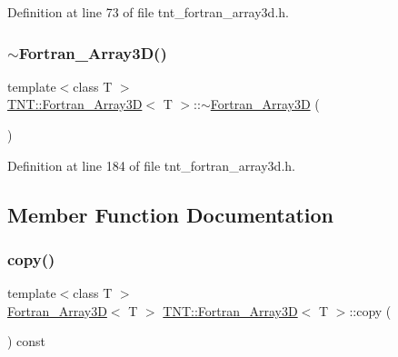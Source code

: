 Definition at line 73 of file tnt\+\_\+fortran\+\_\+array3d.\+h.

\mbox{\label{classTNT_1_1Fortran__Array3D_a9164c5369ef7b82b3c280dc9704527d9}} 
\subsubsection{\texorpdfstring{$\sim$\+Fortran\+\_\+\+Array3\+D()}{~Fortran\_Array3D()}}
{\footnotesize\ttfamily template$<$class T $>$ \\
\hyperlink{classTNT_1_1Fortran__Array3D}{T\+N\+T\+::\+Fortran\+\_\+\+Array3D}$<$ T $>$\+::$\sim$\hyperlink{classTNT_1_1Fortran__Array3D}{Fortran\+\_\+\+Array3D} (\begin{DoxyParamCaption}{ }\end{DoxyParamCaption})}



Definition at line 184 of file tnt\+\_\+fortran\+\_\+array3d.\+h.



\subsection{Member Function Documentation}
\mbox{\label{classTNT_1_1Fortran__Array3D_a8c611d5f5c178ba17716bc55f4d6ef0e}} 
\subsubsection{\texorpdfstring{copy()}{copy()}}
{\footnotesize\ttfamily template$<$class T $>$ \\
\hyperlink{classTNT_1_1Fortran__Array3D}{Fortran\+\_\+\+Array3D}$<$ T $>$ \hyperlink{classTNT_1_1Fortran__Array3D}{T\+N\+T\+::\+Fortran\+\_\+\+Array3D}$<$ T $>$\+::copy (\begin{DoxyParamCaption}{ }\end{DoxyParamCaption}) const}



